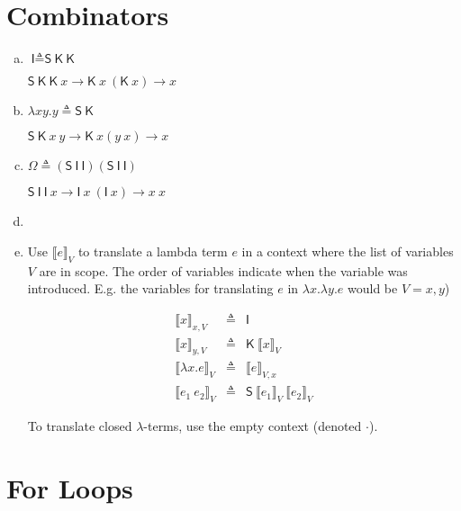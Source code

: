 \documentclass[10pt]{article}
\newcommand{\problem}[1]{\section{\sf #1}}
\newcommand{\translate}[2]{\ensuremath {\llbracket #1 \rrbracket}_{#2}}
\newcommand{\defined}{\triangleq}
\renewcommand{\S}{\textsf{S}}
\newcommand{\K}{\textsf{K}}
\newcommand{\I}{\textsf{I}}
\begin{document}
\problem{Combinators} %
\begin{enumerate}[(a)]
  \item $\I \defined \S~\K~\K$

  $\S~\K~\K~x \rightarrow \K~x~(\K~x) \rightarrow x$
  \item $ \lambda x y.y \defined \S~\K$

  $\S~\K~x~y \rightarrow \K~x(y~x) \rightarrow x$
  \item $\Omega \defined (\S~ \I~ \I) (\S~ \I~ \I)$

  $\S~ \I~ \I~x \rightarrow \I ~ x ~ (\I ~ x) \rightarrow x~x$
  \item
  \item


  Use $\translate{e}{V}$ to translate a lambda term $e$ in a context
  where the list of variables $V$ are in scope. The order of variables indicate
  when the variable was introduced. E.g. the variables for translating $e$ in
  $\lambda x. \lambda y. e$ would be $V = x, y$)

  \begin{eqnarray*}
    \translate{x}{x, V}         & \defined & \I                  \\
    \translate{x}{y, V}         & \defined & \K~\translate{x}{V} \\
    \translate{\lambda x. e}{V} & \defined & \translate{e}{V,x}  \\
    \translate{e_1~e_2}{V}      & \defined & \S~\translate{e_1}{V}~\translate{e_2}{V}
  \end{eqnarray*}

  To translate closed $\lambda$-terms, use the empty context (denoted $\cdot$).

\end{enumerate}
\problem{For Loops} %
\end{document}
